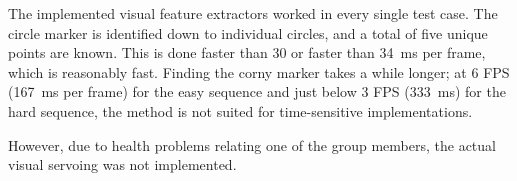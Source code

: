 
The implemented visual feature extractors worked in every single test case.
The circle marker is identified down to individual circles, and a total of five unique points are known.
This is done faster than \SI{30}{\fps} or faster than \SI{34}{\milli\second} per frame, which is reasonably fast.
Finding the corny marker takes a while longer;
at 6 FPS (\SI{167}{\milli\second} per frame) for the easy sequence and just below 3 FPS (\SI{333}{\milli\second}) for the hard sequence,
the method is not suited for time-sensitive implementations.

However, due to health problems relating one of the group members, the actual visual servoing was not implemented.
